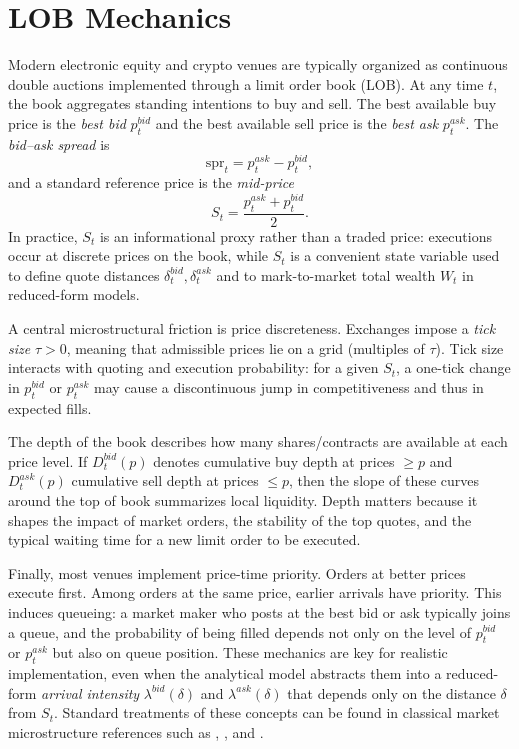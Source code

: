 \documentclass[a4paper,10pt,titlepage,oneside,openany]{book}
\providecommand{\textcite}[1]{\cite{#1}}
\theoremstyle{plain}\newtheorem{theorem}{Theorem}[chapter]
\theoremstyle{definition}\newtheorem{definition}{Definition}[chapter]
\theoremstyle{remark}\newtheorem{remark}{Remark}[chapter]
\begin{document}
\section{LOB Mechanics}
Modern electronic equity and crypto venues are typically organized as continuous double auctions implemented through a limit order book (LOB). At any time $t$, the book aggregates standing intentions to buy and sell. The best available buy price is the \emph{best bid} $p_t^{bid}$ and the best available sell price is the \emph{best ask} $p_t^{ask}$. The \emph{bid--ask spread} is
\[
\mathrm{spr}_t = p_t^{ask}-p_t^{bid},
\]
and a standard reference price is the \emph{mid-price}
\[
S_t=\frac{p_t^{ask}+p_t^{bid}}{2}.
\]
In practice, $S_t$ is an informational proxy rather than a traded price: executions occur at discrete prices on the book, while $S_t$ is a convenient state variable used to define quote distances $\delta_t^{bid},\delta_t^{ask}$ and to mark-to-market total wealth $W_t$ in reduced-form models.

A central microstructural friction is price discreteness. Exchanges impose a \emph{tick size} $\tau>0$, meaning that admissible prices lie on a grid (multiples of $\tau$). Tick size interacts with quoting and execution probability: for a given $S_t$, a one-tick change in $p_t^{bid}$ or $p_t^{ask}$ may cause a discontinuous jump in competitiveness and thus in expected fills.

The depth of the book describes how many shares/contracts are available at each price level. If $D_t^{bid}(p)$ denotes cumulative buy depth at prices $\ge p$ and $D_t^{ask}(p)$ cumulative sell depth at prices $\le p$, then the slope of these curves around the top of book summarizes local liquidity. Depth matters because it shapes the impact of market orders, the stability of the top quotes, and the typical waiting time for a new limit order to be executed.

Finally, most venues implement price-time priority. Orders at better prices execute first. Among orders at the same price, earlier arrivals have priority. This induces queueing: a market maker who posts at the best bid or ask typically joins a queue, and the probability of being filled depends not only on the level of $p_t^{bid}$ or $p_t^{ask}$ but also on queue position. These mechanics are key for realistic implementation, even when the analytical model abstracts them into a reduced-form \emph{arrival intensity} $\lambda^{bid}(\delta)$ and $\lambda^{ask}(\delta)$ that depends only on the distance $\delta$ from $S_t$. Standard treatments of these concepts can be found in classical market microstructure references such as \textcite{OHara1995}, \textcite{Harris2003}, and \textcite{Hasbrouck2007}.
\end{document}

